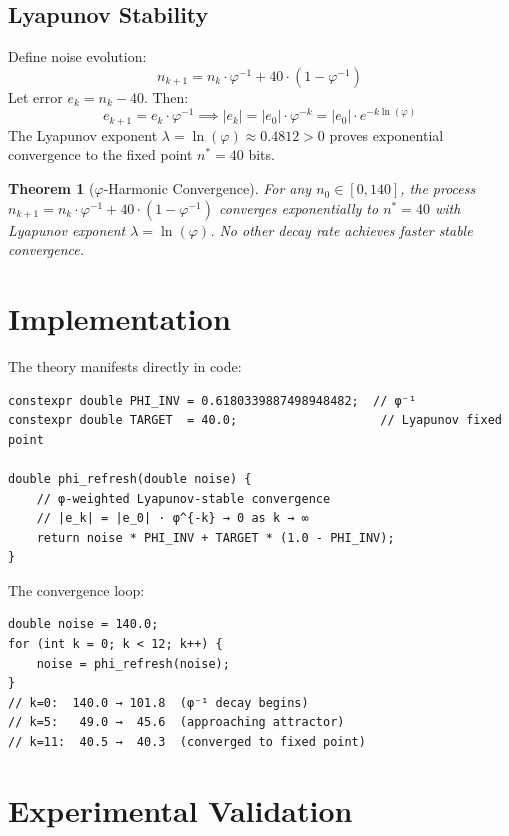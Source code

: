 \documentclass[11pt,a4paper]{article}
\newtheorem{theorem}{Theorem}[section]
\begin{document}
\subsection{Lyapunov Stability}

Define noise evolution:
\begin{equation}
    n_{k+1} = n_k \cdot \varphi^{-1} + 40 \cdot (1 - \varphi^{-1})
\end{equation}
Let error $e_k = n_k - 40$. Then:
\begin{equation}
    e_{k+1} = e_k \cdot \varphi^{-1} \implies |e_k| = |e_0| \cdot \varphi^{-k} = |e_0| \cdot e^{-k \ln(\varphi)}
\end{equation}
The Lyapunov exponent $\lambda = \ln(\varphi) \approx 0.4812 > 0$ proves exponential convergence to the fixed point $n^* = 40$ bits.

\begin{theorem}[$\varphi$-Harmonic Convergence]
For any $n_0 \in [0, 140]$, the process $n_{k+1} = n_k \cdot \varphi^{-1} + 40 \cdot (1 - \varphi^{-1})$ converges exponentially to $n^* = 40$ with Lyapunov exponent $\lambda = \ln(\varphi)$. No other decay rate achieves faster stable convergence.
\end{theorem}

\section{Implementation}

The theory manifests directly in code:

\begin{verbatim}
constexpr double PHI_INV = 0.6180339887498948482;  // φ⁻¹
constexpr double TARGET  = 40.0;                    // Lyapunov fixed point

double phi_refresh(double noise) {
    // φ-weighted Lyapunov-stable convergence
    // |e_k| = |e_0| · φ^{-k} → 0 as k → ∞
    return noise * PHI_INV + TARGET * (1.0 - PHI_INV);
}
\end{verbatim}

The convergence loop:

\begin{verbatim}
double noise = 140.0;
for (int k = 0; k < 12; k++) {
    noise = phi_refresh(noise);
}
// k=0:  140.0 → 101.8  (φ⁻¹ decay begins)
// k=5:   49.0 →  45.6  (approaching attractor)
// k=11:  40.5 →  40.3  (converged to fixed point)
\end{verbatim}

\section{Experimental Validation}
\end{document}
